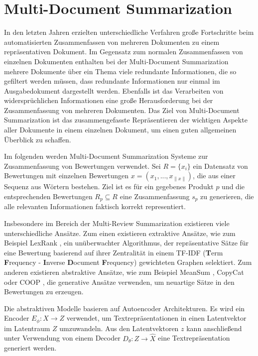 \section{Multi-Document Summarization}
In den letzten Jahren erzielten unterschiedliche Verfahren große Fortschritte beim automatisierten Zusammenfassen von mehreren Dokumenten zu einem repräsentativen Dokument.
Im Gegensatz zum normalen Zusammenfassen von einzelnen Dokumenten enthalten bei der Multi-Document Summarization mehrere Dokumente über ein Thema viele redundante Informationen, die so gefiltert werden müssen, dass redundante Informationen nur einmal im Ausgabedokument dargestellt werden.
Ebenfalls ist das Verarbeiten von widersprüchlichen Informationen eine große Herausforderung bei der Zusammenfassung von mehreren Dokumenten.
Das Ziel von Multi-Document Summarization ist das zusammengefasste Repräsentieren der wichtigen Aspekte aller Dokumente in einem einzelnen Dokument, um einen guten allgemeinen Überblick zu schaffen.

Im folgenden werden Multi-Document Summarization Systeme zur Zusammenfassung von Bewertungen verwendet.
Sei $R= \{x_i \}$ ein Datensatz von Bewertungen mit einzelnen Bewertungen $x=(x_1,...,x_{\| x \|})$, die aus einer Sequenz aus Wörtern bestehen.
Ziel ist es für ein gegebenes Produkt $p$ und die entsprechenden Bewertungen $R_p \subseteq R$ eine Zusammenfassung $s_p$ zu generieren, die alle relevanten Informationen faktisch korrekt representiert.


Insbesondere im Bereich der Multi-Review Summarization existieren viele unterschiedliche Ansätze.
Zum einen existieren extraktive Ansätze, wie zum Beispiel LexRank \citep{lexrank}, ein unüberwachter Algorithmus, der repräsentative Sätze für eine Bewertung basierend auf ihrer Zentralität in einem TF-IDF (\textbf{T}erm \textbf{F}requency - \textbf{I}nverse \textbf{D}ocument \textbf{F}requency) \citep{tfidf} gewichteten Graphen selektiert.
Zum anderen existieren abstraktive Ansätze, wie zum Beispiel MeanSum \citep{meansum}, CopyCat \citep{copycat} oder COOP \citep{coop}, die generative Ansätze verwenden, um neuartige Sätze in den Bewertungen zu erzeugen.

Die abstraktiven Modelle basieren auf Autoencoder Architekturen. Es wird ein Encoder $E_\phi : X \rightarrow Z$ verwendet, um Textrepräsentationen in einen Latentvektor im Latentraum $Z$ umzuwandeln.
Aus den Latentvektoren $z$ kann anschließend unter Verwendung von einem Decoder $D_\theta : Z \rightarrow \hat{X}$ eine Textrepräsentation generiert werden.


